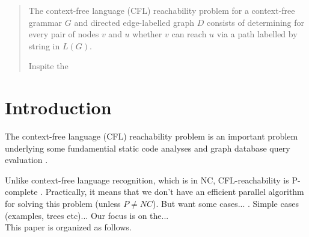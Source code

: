 
\author{Ekaterina Shemetova         \and
        Semyon Grigorev %
}



\date{Received: date / Accepted: date}


\maketitle

\begin{abstract}
The context-free language (CFL) reachability problem for a context-free grammar $G$ and directed edge-labelled graph $D$ consists of determining for every pair of nodes  $v$ and $u$ whether $v$ can reach $u$ via a path labelled by string in $L(G)$. 
\par
Inspite the 
\end{abstract}



\section{Introduction}
\label{intro}
The context-free language (CFL) reachability problem is an important problem underlying some fundamential static code analyses \cite*{RepsBasic, Incremental} and graph database query evaluation \cite{HellingsCFPQ}\cite{RDF}\cite{GrigorevRagozina}.
\par
Unlike context-free language recognition, which is in NC, CFL-reachability is P-complete \cite{Yannakakis}\cite{RepSeq}. Practically, it means that we don't have an efficient parallel algorithm for solving this problem (unless $P \neq NC$). But want some cases... . Simple cases (examples, trees etc)... Our focus is on the...
\\This paper is organized as follows.
